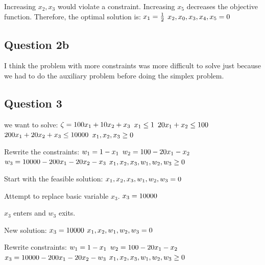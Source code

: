 \documentclass[17pt]{extarticle}
\begin{document}
\bigskip Increasing $x_2, x_3$ would violate a constraint. Increasing $x_5$ decreases the objective function. Therefore, the optimal solution is:
$\\x_1 = \frac{1}{2}$
$\\x_2, x_0, x_3, x_4, x_5 = 0$

\newpage
\subsection*{Question 2b}
I think the problem with more constraints was more difficult to solve just because we had to do the auxiliary problem before doing the simplex problem.

\newpage
\subsection*{Question 3}
we want to solve:
$\\ \zeta = 100x_1 + 10x_2 + x_3$
$\\ x_1 \leq 1$
$\\ 20x_1 + x_2 \leq 100$
$\\ 200x_1 + 20x_2 + x_3 \leq 10000$
$\\ x_1, x_2, x_3 \geq 0$

\bigskip Rewrite the constraints:
$\\ w_1 = 1 - x_1$
$\\ w_2 = 100 - 20x_1 - x_2$
$\\ w_3 = 10000 - 200x_1 - 20x_2 - x_3$
$\\ x_1, x_2, x_3, w_1, w_2, w_3 \geq 0$

\bigskip Start with the feasible solution:
$\\ x_1, x_2, x_3, w_1, w_2, w_3 = 0$

\bigskip Attempt to replace basic variable $x_3$.
$\\ x_3 = 10000$

\bigskip $x_3$ enters and $w_3$ exits.

\bigskip New solution:
$\\ x_3 = 10000$
$\\ x_1, x_2, w_1, w_2, w_3 = 0$


\bigskip Rewrite constraints:
$\\ w_1 = 1 - x_1$
$\\ w_2 = 100 - 20x_1 - x_2$
$\\ x_3 = 10000 - 200x_1 - 20x_2 - w_3$
$\\ x_1, x_2, x_3, w_1, w_2, w_3 \geq 0$
\end{document}
